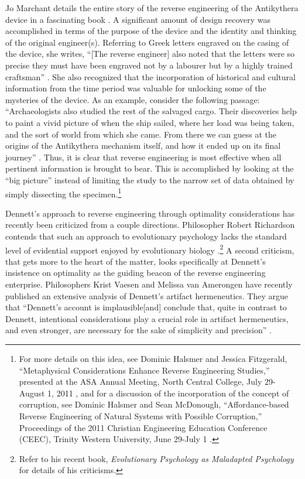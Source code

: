 Jo Marchant details the entire story of the reverse engineering of the
\mbox{Antikythera} device in a fascinating book \citep{marchant2009}. A
significant amount of design recovery was accomplished in terms of the
purpose of the device and the identity and thinking of the original
engineer(s). Referring to Greek letters engraved on the casing of the
device, she writes, “[The reverse engineer] also noted that the letters
were so precise they must have been engraved not by a labourer but by a
highly trained craftsman” \citep[][p.~55]{marchant2009}. She also recognized that
the incorporation of historical and cultural information from the time
period was valuable for unlocking some of the mysteries of the device.
As an example, consider the following passage: ``Archaeologists also
studied the rest of the salvaged cargo. Their discoveries help to paint
a vivid picture of when the ship sailed, where her load was being
taken, and the sort of world from which she came. From there we can
guess at the origins of the Antikythera mechanism itself, and how it
ended up on its final journey'' \citep[][p.~61]{marchant2009}. Thus, it is clear
that reverse engineering is most effective when all pertinent
information is brought to bear. This is accomplished by looking at the
“big picture” instead of limiting the study to the narrow set of data
obtained by simply dissecting the specimen.\footnote{%
For more details on this idea, see Dominic Halsmer
and Jessica Fitzgerald, ``Metaphysical Considerations Enhance Reverse
Engineering Studies,'' presented at the ASA Annual Meeting, North
Central College, July 29-August 1, 2011 \citep{halsmerfitzgerald2011}, and for a discussion of the
incorporation of the concept of corruption, see Dominic Halsmer and
Sean McDonough, ``Affordance-based Reverse Engineering of Natural
Systems with Possible Corruption,'' Proceedings of the 2011 Christian
Engineering Education Conference (CEEC), Trinity Western University,
June 29-July 1 \citep{halsmermcdonough2011}.
}

Dennett’s approach to reverse engineering through optimality
considerations has recently been criticized from a couple directions.
Philosopher Robert Richardson contends that such an approach to
evolutionary psychology lacks the standard level of evidential support
enjoyed by evolutionary biology \citep{richardson2007}.\footnote{Refer to his recent
book, \textit{Evolutionary Psychology as Maladapted Psychology} \citep{richardson2007} for details of his 
criticisms.} A second
criticism, that gets more to the heart of the matter, looks
specifically at Dennett’s insistence on optimality as the guiding
beacon of the reverse engineering enterprise. Philosophers Krist Vaesen
and Melissa van Amerongen have recently published an extensive analysis
of Dennett’s artifact hermeneutics. They argue that “Dennett’s account
is implausible{\jdots}[and] conclude that, quite in contrast to Dennett,
intentional considerations play a crucial role in artifact
hermeneutics, and even stronger, are necessary for the sake of
simplicity and precision” \citep[][p.~779]{vaesenamerongen2008}.

